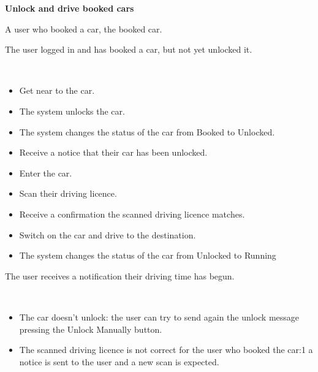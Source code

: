 \documentclass[11pt]{article} %
\begin{document}
\begin{description}[noitemsep,topsep=0pt,parsep=0pt,partopsep=0pt]
	\item[Name:] \textbf{Unlock and drive booked cars}
	\item[Actors Involved:] A user who booked a car, the booked car.
	\item[Entry Conditions:] The user logged in and has booked a car, but not yet unlocked it.
	\item[Flow Of Events:] \hfill\
	\begin{itemize}
		\item Get near to the car.
		\item The system unlocks the car.
		\item The system changes the status of the car from Booked to Unlocked.
		\item Receive a notice that their car has been unlocked.
		\item Enter the car.
		\item Scan their driving licence.
		\item Receive a confirmation the scanned driving licence matches.
		\item Switch on the car and drive to the destination.
		\item The system changes the status of the car from Unlocked to Running
	\end{itemize}
	\item[Exit conditions:]  The user receives a notification their driving time has begun.
	\item[Exceptions:] \hfill\
	\begin{itemize}
		\item The car doesn't unlock: the user can try to send again the unlock message pressing the Unlock Manually button.
		\item The scanned driving licence is not correct for the user who booked the car:1 a notice is sent to the user and a new scan is expected.
	\end{itemize}
\end{description}
\hfill\
\end{document}
